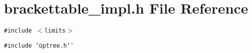 \section{brackettable\_\-impl.h File Reference}
\label{brackettable__impl_8h}
{\tt \#include $<$limits$>$}\par
{\tt \#include \char`\"{}uptree.h\char`\"{}}\par
